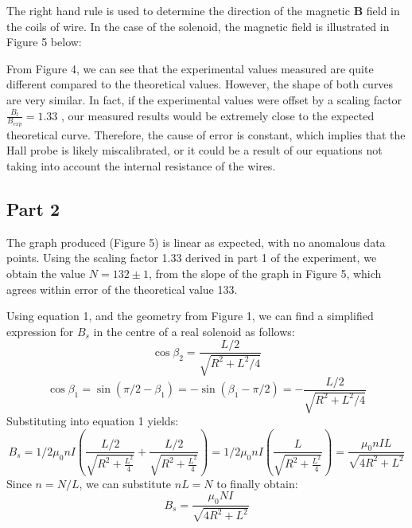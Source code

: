 \documentclass[letterpaper]{article}
\begin{document}
The right hand rule is used to determine the
direction of the magnetic $\textbf{B}$ field in the coils of wire. In the case of the
solenoid, the magnetic field is illustrated in Figure 5 below:


From Figure 4, we can see that the experimental values measured are quite different
compared to the theoretical values. However, the shape of both curves are very similar.
In fact, if the experimental values were offset by a scaling factor $\frac{B_t}{B_{exp}}=1.33$ , our
measured results would be extremely close to the expected theoretical curve. Therefore,
the cause of error is constant, which implies that the Hall probe is likely miscalibrated,
or it could be a result of our equations not taking into account the internal resistance of the wires.



\subsection{Part 2}


The graph produced (Figure 5) is linear as expected, with no anomalous data points.
Using the scaling factor 1.33 derived in part 1 of the experiment, we obtain the value $N=132 \pm 1$,
from the slope of the graph in Figure 5, which agrees within error of the theoretical value 133.



Using equation 1, and the geometry from Figure 1, we can find a simplified expression for $B_s$ in the centre of a real solenoid as follows:
$$ \cos{\beta_2} = \frac{L/2}{\sqrt{R^2+L^2/4}}$$
$$ \cos{\beta_1} = \sin{(\pi/2 - \beta_1)} = -\sin{(\beta_1-\pi/2)} = -\frac{L/2}{\sqrt{R^2+L^2/4}}  $$
Substituting into equation 1 yields:
$$ B_s = 1/2 \mu_0nI \left(\frac{L/2}{\sqrt{R^2+\frac{L^2}{4}}} + \frac{L/2}{\sqrt{R^2+\frac{L^2}{4}}} \right) =  1/2\mu_0nI \left(\frac{L}{\sqrt{R^2+\frac{L^2}{4}}} \right)= \frac{\mu_0nIL}{\sqrt{4R^2+L^2}}$$
Since $n=N/L$, we can substitute $nL=N$ to finally obtain:
$$ B_s= \frac{\mu_0NI}{\sqrt{4R^2+L^2}} $$
\end{document}
